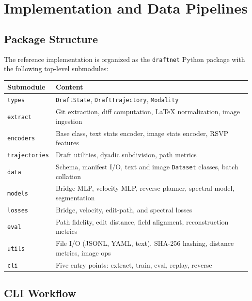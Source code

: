 \documentclass[12pt,a4paper]{article}
\theoremstyle{draftthm}
\newcommand{\code}[1]{\texttt{\small #1}}
\begin{document}
\section{Implementation and Data Pipelines}
\label{sec:implementation}

\subsection{Package Structure}

The reference implementation is organized as the \code{draftnet} Python package with the following top-level submodules:

\begin{center}
\begin{tabular}{ll}
\toprule
Submodule & Content \\
\midrule
\code{types} & \code{DraftState}, \code{DraftTrajectory}, \code{Modality} \\
\code{extract} & Git extraction, diff computation, \LaTeX{} normalization, image ingestion \\
\code{encoders} & Base class, text stats encoder, image stats encoder, RSVP features \\
\code{trajectories} & Draft utilities, dyadic subdivision, path metrics \\
\code{data} & Schema, manifest I/O, text and image \code{Dataset} classes, batch collation \\
\code{models} & Bridge MLP, velocity MLP, reverse planner, spectral model, segmentation \\
\code{losses} & Bridge, velocity, edit-path, and spectral losses \\
\code{eval} & Path fidelity, edit distance, field alignment, reconstruction metrics \\
\code{utils} & File I/O (JSONL, YAML, text), SHA-256 hashing, distance metrics, image ops \\
\code{cli} & Five entry points: extract, train, eval, replay, reverse \\
\bottomrule
\end{tabular}
\end{center}

\subsection{CLI Workflow}
\end{document}
